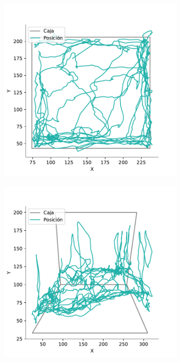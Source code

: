 \begin{figure}[H]
\begin{subfigure}{0.45\textwidth}
    \caption{}
  \end{subfigure}
  \begin{subfigure}{0.45\textwidth}
    \centering
    \includegraphics[width=\textwidth]{figures/interpolated-trayectory-top-4128-2020-12-02.pdf}
    \caption{}
  \end{subfigure}
  \begin{subfigure}{0.45\textwidth}
    \centering
    \includegraphics[width=\textwidth]{figures/interpolated-trayectory-lateral-4128-2020-12-02.pdf}

\end{subfigure}
\end{figure}
